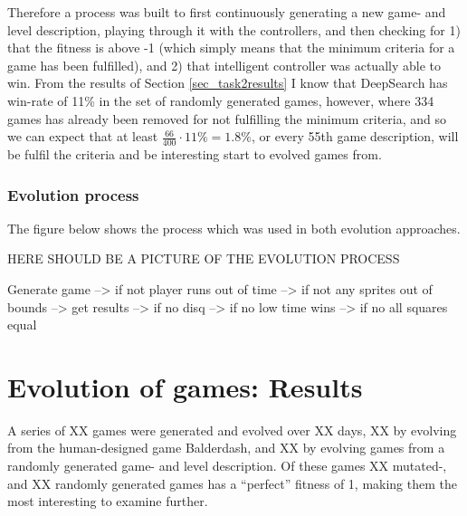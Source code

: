 \documentclass[a4paper,titlepage,final]{report}
\begin{document}
Therefore a process was built to first continuously generating a new game- and level description, playing through it with the controllers, and then checking for 1) that the fitness is above -1 (which simply means that the minimum criteria for a game has been fulfilled), and 2) that intelligent controller was actually able to win.
From the results of Section \ref{sec_task2results} I know that DeepSearch has win-rate of 11\% in the set of randomly generated games, however, where 334 games has already been removed for not fulfilling the minimum criteria, and so we can expect that at least $\frac{66}{400}\cdot 11\% = 1.8\%$, or every 55th game description, will be fulfil the criteria and be interesting start to evolved games from.


\subsubsection*{Evolution process}

The figure below shows the process which was used in both evolution approaches.


HERE SHOULD BE A PICTURE OF THE EVOLUTION PROCESS


Generate game --> if not player runs out of time --> if not any sprites out of bounds --> get results --> if no disq --> if no low time wins --> if no all squares equal


\section{Evolution of games: Results}
\label{sec_task2evolvingGames}
A series of XX games were generated and evolved over XX days, XX by evolving from the human-designed game Balderdash, and XX by evolving games from a randomly generated game- and level description.
Of these games XX mutated-, and XX randomly generated games has a ``perfect'' fitness of 1, making them the most interesting to examine further.
\end{document}
